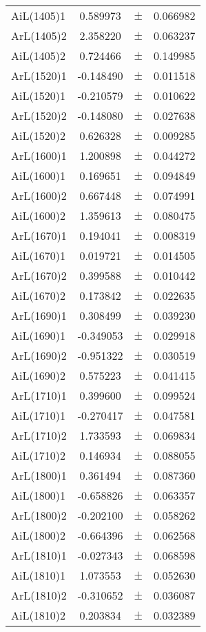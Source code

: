 \begin{table}
\begin{tiny}
\begin{tabular}{lccc}
AiL(1405)1 & 0.589973 & $\pm$ & 0.066982 \\
ArL(1405)2 & 2.358220 & $\pm$ & 0.063237 \\
AiL(1405)2 & 0.724466 & $\pm$ & 0.149985 \\
ArL(1520)1 & -0.148490 & $\pm$ & 0.011518 \\
AiL(1520)1 & -0.210579 & $\pm$ & 0.010622 \\
ArL(1520)2 & -0.148080 & $\pm$ & 0.027638 \\
AiL(1520)2 & 0.626328 & $\pm$ & 0.009285 \\
ArL(1600)1 & 1.200898 & $\pm$ & 0.044272 \\
AiL(1600)1 & 0.169651 & $\pm$ & 0.094849 \\
ArL(1600)2 & 0.667448 & $\pm$ & 0.074991 \\
AiL(1600)2 & 1.359613 & $\pm$ & 0.080475 \\
ArL(1670)1 & 0.194041 & $\pm$ & 0.008319 \\
AiL(1670)1 & 0.019721 & $\pm$ & 0.014505 \\
ArL(1670)2 & 0.399588 & $\pm$ & 0.010442 \\
AiL(1670)2 & 0.173842 & $\pm$ & 0.022635 \\
ArL(1690)1 & 0.308499 & $\pm$ & 0.039230 \\
AiL(1690)1 & -0.349053 & $\pm$ & 0.029918 \\
ArL(1690)2 & -0.951322 & $\pm$ & 0.030519 \\
AiL(1690)2 & 0.575223 & $\pm$ & 0.041415 \\
ArL(1710)1 & 0.399600 & $\pm$ & 0.099524 \\
AiL(1710)1 & -0.270417 & $\pm$ & 0.047581 \\
ArL(1710)2 & 1.733593 & $\pm$ & 0.069834 \\
AiL(1710)2 & 0.146934 & $\pm$ & 0.088055 \\
ArL(1800)1 & 0.361494 & $\pm$ & 0.087360 \\
AiL(1800)1 & -0.658826 & $\pm$ & 0.063357 \\
ArL(1800)2 & -0.202100 & $\pm$ & 0.058262 \\
AiL(1800)2 & -0.664396 & $\pm$ & 0.062568 \\
ArL(1810)1 & -0.027343 & $\pm$ & 0.068598 \\
AiL(1810)1 & 1.073553 & $\pm$ & 0.052630 \\
ArL(1810)2 & -0.310652 & $\pm$ & 0.036087 \\
AiL(1810)2 & 0.203834 & $\pm$ & 0.032389 \\

\end{tabular}
\end{tiny}
\end{table}
